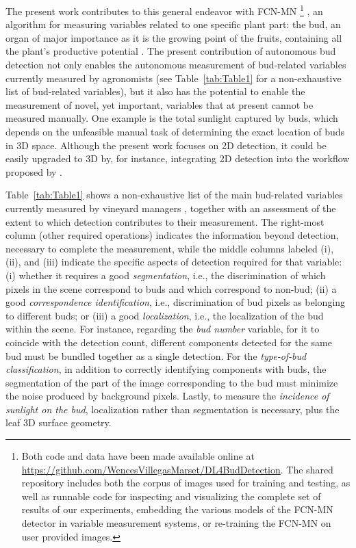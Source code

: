 \documentclass[a4paper,authoryear,review]{elsarticle}
\begin{document}
	
	The present work contributes to this general endeavor with FCN-MN \footnote{Both code and data have been made available online at \url{https://github.com/WencesVillegasMarset/DL4BudDetection}. The shared repository includes both the corpus of images used for training and testing, as well as runnable code for inspecting and visualizing the complete set of results of our experiments, embedding the various models of the FCN-MN detector in variable measurement systems, or re-training the FCN-MN on user provided images.} \citep{long2015fully, shelhamer2017fully}, an algorithm for measuring variables related to one specific plant part: the bud, an organ of major importance as it is the growing point of the fruits, containing all the plant’s productive potential \citep{may2000bud}. 
	The present contribution of autonomous bud detection not only enables the autonomous measurement of bud-related variables currently measured by agronomists (see Table~\ref{tab:Table1} for a non-exhaustive list of bud-related variables), but it also has the potential to enable the measurement of novel, yet important, variables that at present cannot be measured manually. One example is the total sunlight captured by buds, which depends on the unfeasible manual task of determining the exact location of buds in 3D space. Although the present work focuses on 2D detection, it could be easily upgraded to 3D by, for instance, integrating 2D detection into the workflow proposed by \citet{diaz2018grapevine}.
	
	
	Table~\ref{tab:Table1} shows a non-exhaustive list of the main bud-related variables currently measured by vineyard managers \citep{sanchez2005bud, noyce2016basis, collins2020effects}, together with an assessment of the extent to which detection contributes to their measurement. The right-most column (other required operations) indicates the information beyond detection, necessary to complete the measurement, while the middle columns labeled (i), (ii), and (iii) indicate the specific aspects of detection required for that variable: (i) whether it requires a good \emph{segmentation}, i.e., the discrimination of which pixels in the scene correspond to buds and which correspond to non-bud; (ii) a good \emph{correspondence identification}, i.e., discrimination of bud pixels as belonging to different buds; or (iii) a good \emph{localization}, i.e., the localization of the bud within the scene.
	For instance, regarding the \emph{bud number} variable, for it to coincide with the detection count, different components detected for the same bud must be bundled together as a single detection. For the \emph{type-of-bud classification}, in addition to correctly identifying components with buds, the segmentation of the part of the image corresponding to the bud must minimize the noise produced by background pixels. Lastly, to measure the \emph{incidence of sunlight on the bud}, localization rather than segmentation is necessary, plus the leaf 3D surface geometry.
	
\end{document}
